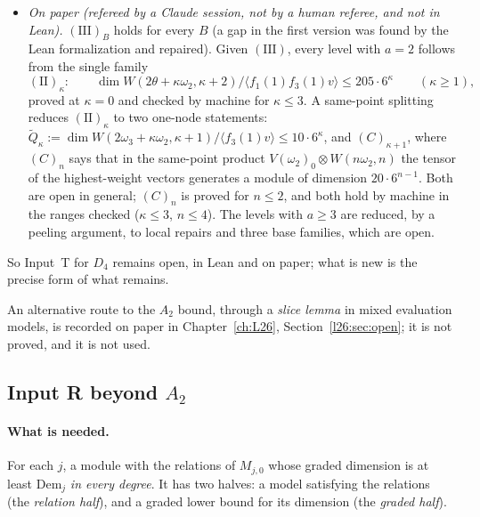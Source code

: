 \begin{itemize}
  from a stratum count of a coefficient ring alone, and  reduces that count to its
  low strata. The marked full-flag rings behind the count have their exact dimensions and stratum bounds in Lean; the step still
  missing is the descent from those rings to the coefficient ring.
\item \emph{On paper (refereed by a Claude session, not by a human referee, and not in Lean).} $(\mathrm{III})_B$ holds for every
  $B$ (a gap in the first version was found by the Lean formalization and repaired). Given $(\mathrm{III})$, every level with $a=2$
  follows from the single family
  \begin{equation*}
    (\mathrm{II})_\kappa:\qquad \dim W(2\theta+\kappa\omega_2,\kappa+2)/\langle f_1(1)f_3(1)v\rangle\le205\cdot6^\kappa\qquad(\kappa\ge1),
  \end{equation*}
  proved at $\kappa=0$ and checked by machine for $\kappa\le3$. A same-point splitting reduces $(\mathrm{II})_\kappa$ to two
  one-node statements: $\tilde Q_\kappa:=\dim W(2\omega_3+\kappa\omega_2,\kappa+1)/\langle f_3(1)v\rangle\le10\cdot6^\kappa$, and
  $(C)_{\kappa+1}$, where $(C)_n$ says that in the same-point product $V(\omega_2)_0\otimes W(n\omega_2,n)$ the tensor of the
  highest-weight vectors generates a module of dimension $20\cdot6^{n-1}$. Both are open in general; $(C)_n$ is proved for
  $n\le2$, and both hold by machine in the ranges checked ($\kappa\le3$, $n\le4$). The levels with $a\ge3$ are reduced, by a
  peeling argument, to local repairs and three base families, which are open.
\end{itemize}
So Input~T for $D_4$ remains open, in Lean and on paper; what is new is the precise form of what remains.

An alternative route to the $A_2$ bound, through a \emph{slice lemma} in mixed evaluation models, is recorded on paper in
Chapter~\ref{ch:L26}, Section~\ref{l26:sec:open}; it is not proved, and it is not used.

\subsection{Input R beyond \texorpdfstring{$A_2$}{A2}}\label{l27:sec:demcore}

\paragraph{What is needed.} For each $j$, a module with the relations of $M_{j,0}$ whose graded dimension is at least $\mathrm{Dem}_j$
\emph{in every degree}. It has two halves: a model satisfying the relations (the \emph{relation half}), and a graded lower bound for its
dimension (the \emph{graded half}).

